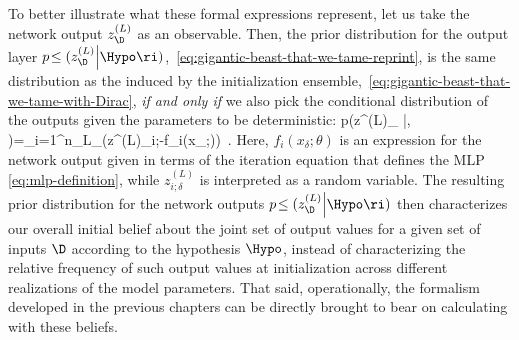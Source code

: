 To better illustrate what these formal expressions represent, let us take the network output $z^{(L)}_{\D}$ as an observable.
Then, the prior distribution for the output layer $p\!\le(z^{(L)}_{\D} \Big| \Hypo \ri)$,~\eqref{eq:gigantic-beast-that-we-tame-reprint}, is the same distribution as the  induced by the initialization ensemble,~\eqref{eq:gigantic-beast-that-we-tame-with-Dirac},
\emph{if and only if} we also pick the conditional distribution of the outputs given the parameters to be deterministic:
\be\label{eq:deterministic-conditional-Bayes}
p\!\le(z^{(L)}_{\D} \Big|\theta, \Hypo \ri)=\prod_{i=1}^{n_{L}}\prod_{\delta\in\D}\delta\Big(z^{(L)}_{i;\delta}-f_i(x_{\delta};\theta)\Big)\, .
\ee
Here, $f_i(x_{\delta};\theta)$ is an expression for the network output given in terms of the iteration equation that defines the MLP \eqref{eq:mlp-definition}, while $z^{(L)}_{i;\delta}$ is interpreted as a random variable.
The resulting prior distribution for the network outputs $p\!\le(z^{(L)}_{\D} \Big| \Hypo \ri)$ then characterizes our overall initial belief
about the joint set of output values for a given set of inputs $\D$ according to the hypothesis $\Hypo$,
instead of characterizing the relative frequency of such output values at initialization across different realizations of the model parameters. That said, operationally, the formalism developed in the previous chapters can be directly brought to bear on calculating 
with
these  
beliefs.

